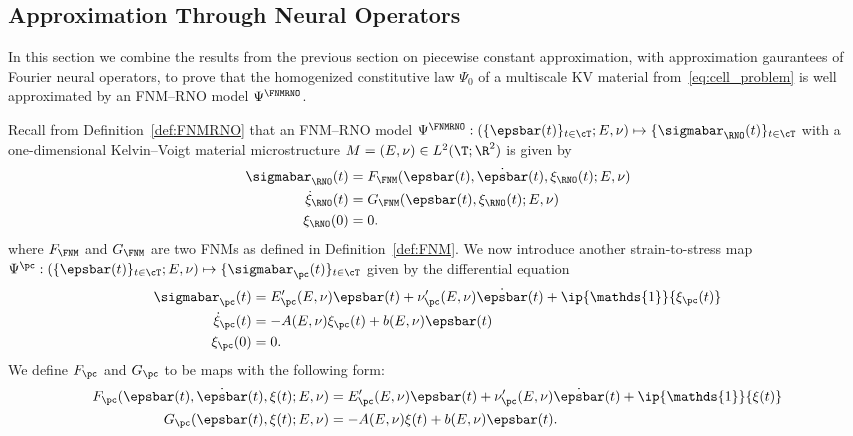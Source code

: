 \documentclass[letterpaper,11pt]{article}
\begin{document}
\subsection{Approximation Through Neural Operators}\label{ssec:neuralop}
In this section we combine the results from the previous section on piecewise constant approximation, with approximation gaurantees of Fourier neural operators, to prove that the homogenized constitutive law $\Psi_0$ of a multiscale KV material from~\eqref{eq:cell_problem} is well approximated by an FNM--RNO model $\Psi^{\FNMRNO}$.

Recall from Definition~\ref{def:FNMRNO} that an FNM--RNO model $\Psi^{\FNMRNO}: (\{\epsbar(t)\}_{t \in \cT}; E, \nu) \mapsto \{\sigmabar_{\RNO}(t)\}_{t \in \cT}$ with a one-dimensional Kelvin--Voigt material microstructure $M = (E, \nu) \in L^2(\T; \R^2)$ is given by
\begin{equation}\label{eq:FNMRNO_model}
\begin{aligned}
\sigmabar_{\RNO}(t) &= F_{\FNM}(\epsbar(t), \dot{\epsbar}(t), \xi_{\RNO}(t); E, \nu)\\
\dot{\xi}_{\RNO}(t) &= G_{\FNM}(\epsbar(t), \xi_{\RNO}(t); E, \nu)\\
\xi_{\RNO}(0) &= 0.
\end{aligned}
\end{equation}
where $F_{\FNM}$ and $G_{\FNM}$ are two FNMs as defined in Definition~\ref{def:FNM}. We now introduce another strain-to-stress map $\Psi^{\pc}: (\{\epsbar(t)\}_{t \in \cT}; E, \nu) \mapsto \{\sigmabar_{\pc}(t)\}_{t \in \cT}$ given by the differential equation
\begin{equation}\label{eq:pc_model}
\begin{aligned}
\sigmabar_{\pc}(t) &= E_{\pc}'(E, \nu)\epsbar(t) + \nu_{\pc}'(E, \nu)\dot{\epsbar}(t) + \ip{\mathds{1}}{\xi_{\pc}(t)}\\
\dot{\xi}_{\pc}(t) &= -A(E, \nu)\xi_{\pc}(t) + b(E, \nu)\epsbar(t)\\
\xi_{\pc}(0) &= 0.
\end{aligned}
\end{equation}
We define $F_{\pc}$ and $G_{\pc}$ to be maps with the following form:
\begin{subequations}\label{eqn:FGpc}
\begin{align}
F_{\pc}(\epsbar(t), \dot{\epsbar}(t), \xi(t); E, \nu) & = E_{\pc}'(E, \nu)\epsbar(t) + \nu_{\pc}'(E, \nu)\dot{\epsbar}(t) + \ip{\mathds{1}}{\xi(t)} \\
G_{\pc}(\epsbar(t), \xi(t); E, \nu) & = -A(E, \nu)\xi(t) + b(E, \nu)\epsbar(t).
\end{align}
\end{subequations}
\end{document}
